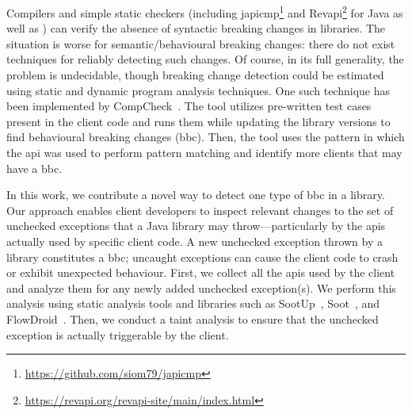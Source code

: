 Compilers and simple static
checkers (including japicmp\footnote{\url{https://github.com/siom79/japicmp}} and
Revapi\footnote{\url{https://revapi.org/revapi-site/main/index.html}} for Java as well
as \cite{brito18:_apidif,foo18:_effic_static_check_librar_updat})
can verify the absence of syntactic breaking changes in libraries. The situation
is worse for semantic/behavioural breaking changes:
there do not exist techniques for reliably detecting such changes. Of
course, in its full generality, the problem is undecidable, though
breaking change detection could be estimated using static and dynamic program analysis
techniques. One such technique has been implemented by CompCheck~\cite{CompCheck}.
The tool utilizes pre-written test cases present in the client code and runs them
while updating the library versions to find behavioural breaking changes (\gls{bbc}). Then,
the tool uses the pattern in which the \gls{api} was used to perform pattern matching
and identify more clients that may have a \gls{bbc}.

In this work, we contribute a novel way to detect one type of \gls{bbc} in a library.
Our approach enables client developers to inspect relevant changes to the set of
unchecked exceptions that a Java library may throw—particularly by the \gls{api}s
actually used by specific client code. A new unchecked exception thrown by a library
constitutes a \gls{bbc}; uncaught exceptions can cause the client code to crash or
exhibit unexpected behaviour. First, we collect all the \gls{api}s used by the client
and analyze them for any newly added unchecked exception(s). We perform this analysis
using static analysis tools and libraries such as SootUp~\cite{Karakaya24:_SootUp},
Soot~\cite{vallee2010soot}, and FlowDroid~\cite{Arzt14:_flowdroid}. Then, we conduct
a taint analysis to ensure that the unchecked exception is actually triggerable by
the client.


